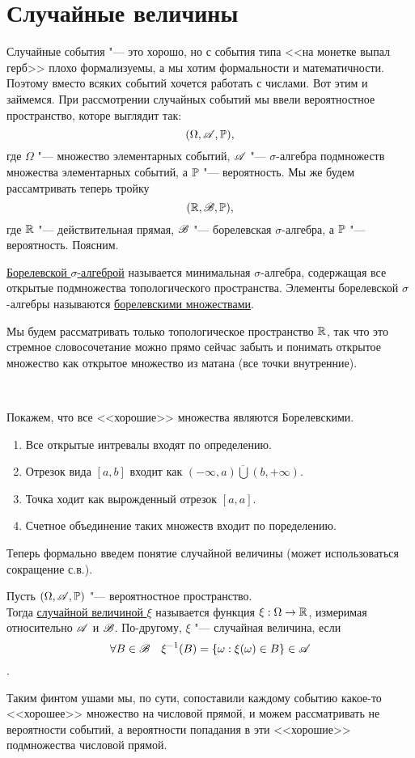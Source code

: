 \documentclass[../TV&MS.tex]{subfiles}
\begin{document}
    
\section{Случайные величины}

\qquad Случайные события "--- это хорошо, но с события типа <<на монетке выпал герб>> плохо формализуемы, а мы хотим формальности и математичности. Поэтому вместо всяких событий хочется работать с числами. Вот этим и займемся. При рассмотрении случайных событий мы ввели вероятностное пространство, которе выглядит так:
$$(\Omega, \mathscr{A}, \mathbb{P}),$$
где $\Omega$ "--- множество элементарных событий, $\mathscr{A}$ "--- $\sigma$-алгебра подмножеств множества элементарных событий, а $\mathbb{P}$ "--- вероятность. Мы же будем рассамтривать теперь тройку
$$(\mathbb{R}, \mathscr{B}, \mathbb{P}),$$
где $\mathbb{R}$ "--- действительная прямая, $\mathscr{B}$ "--- борелевская $\sigma$-алгебра, а $\mathbb{P}$ "--- вероятность. Поясним.

\begin{Def}
\underline{Борелевской $\sigma$-алгеброй} называется минимальная $\sigma$-алгебра, содержащая все открытые подмножества топологического пространства. Элементы борелевской $\sigma$-алгебры называются \underline{борелевскими множествами}.
\end{Def}
\begin{Wtf}
Мы будем рассматривать только топологическое пространство $\mathbb{R}$, так что это стремное словосочетание можно прямо 
сейчас забыть и понимать открытое множество как открытое множество из матана (все точки внутренние).
\end{Wtf}\\
\begin{Ex}
Покажем, что все <<хорошие>> множества являются Борелевскими.
\begin{enumerate}
\item Все открытые интревалы входят по определению.
\item Отрезок вида $[a, b]$ входит как $\overline{(-\infty, a) \bigcup (b, +\infty)}$.
\item Точка ходит как вырожденный отрезок $[a, a]$.
\item Счетное объединение таких множеств входит по поределению.
\end{enumerate}
\end{Ex}

Теперь формально введем понятие случайной величины (может использоваться сокращение с.в.).

\begin{Def}
Пусть $(\Omega, \mathscr{A}, \mathbb{P})$ "--- вероятностное пространство.\\ Тогда \underline{случайной величиной $\xi$} называется функция $\xi : \Omega \to \mathbb{R}$, измеримая относительно $\mathscr{A}$ и $\mathscr{B}$. По-другому, $\xi$ "--- случайная величина, если
$$\forall B \in \mathscr{B} \quad \xi^{-1}(B) = \lbrace \omega : \xi(\omega) \in B \rbrace \in \mathscr{A}$$.
\end{Def}
\begin{Wtf}
Таким финтом ушами мы, по сути, сопоставили каждому событию какое-то <<хорошее>> множество на числовой прямой, и можем рассматривать не вероятности событий, а вероятности попадания в эти <<хорошие>> подмножества числовой прямой.
\end{Wtf}
\end{document}
